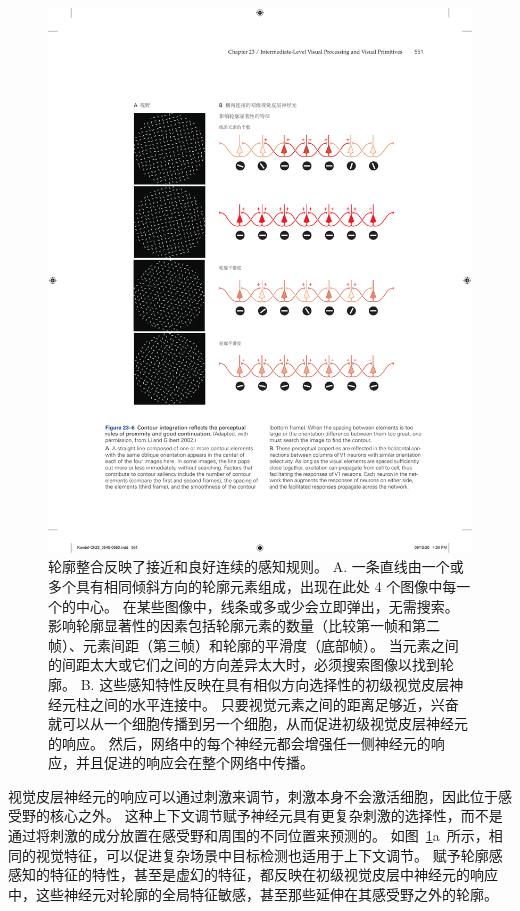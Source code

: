 \begin{figure}[htbp]
	\centering
	\includegraphics[width=1.0\linewidth]{chap23/fig_23_6}
	\caption{轮廓整合反映了接近和良好连续的感知规则\cite{li2002global}。
		A. 一条直线由一个或多个具有相同倾斜方向的轮廓元素组成，出现在此处 4 个图像中每一个的中心。
		在某些图像中，线条或多或少会立即弹出，无需搜索。
		影响轮廓显著性的因素包括轮廓元素的数量（比较第一帧和第二帧）、元素间距（第三帧）和轮廓的平滑度（底部帧）。
		当元素之间的间距太大或它们之间的方向差异太大时，必须搜索图像以找到轮廓。
		B. 这些感知特性反映在具有相似方向选择性的初级视觉皮层神经元柱之间的水平连接中。
		只要视觉元素之间的距离足够近，兴奋就可以从一个细胞传播到另一个细胞，从而促进初级视觉皮层神经元的响应。
		然后，网络中的每个神经元都会增强任一侧神经元的响应，并且促进的响应会在整个网络中传播。}
	\label{fig:23_6}
\end{figure}


视觉皮层神经元的响应可以通过刺激来调节，刺激本身不会激活细胞，因此位于感受野的核心之外。
这种上下文调节赋予神经元具有更复杂刺激的选择性，而不是通过将刺激的成分放置在感受野和周围的不同位置来预测的。
如图~\ref{fig:23_6}a~所示，相同的视觉特征，可以促进复杂场景中目标检测也适用于上下文调节。
赋予轮廓感感知的特征的特性，甚至是虚幻的特征，都反映在初级视觉皮层中神经元的响应中，这些神经元对轮廓的全局特征敏感，甚至那些延伸在其感受野之外的轮廓。


